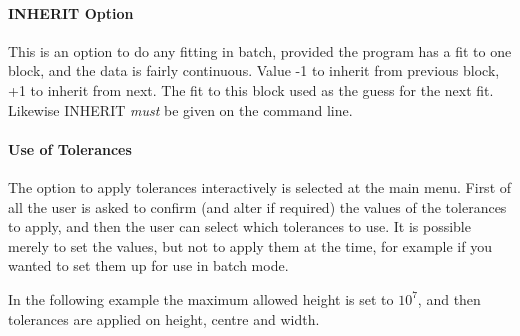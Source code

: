 \paragraph{INHERIT Option}

This is an option to do any fitting in batch, provided the program has
a fit to one block, and the data is fairly continuous. Value -1 to
inherit from previous block, +1 to inherit from next.
The fit to this block used as the guess for the next fit.
Likewise INHERIT {\em must} be given on the command line.

\paragraph{Use of Tolerances}
\label{sec.tols}

The option to apply tolerances interactively is selected at the main
menu.
First of all the user is asked to confirm (and alter if required) the
values of the tolerances to apply, and then the user can select which
tolerances to use.
It is possible merely to set the values, but not to apply them at the
time, for example if you wanted to set them up for use in batch mode.

In the following example the maximum allowed height is set to $10^{7}$,
and then tolerances are applied on height, centre and width.

